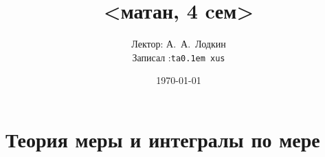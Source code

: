\documentclass[timbord,12pt]{longnotes}
\title{<матан, 4 cем>}
\date{\today}
\author{Лектор: А.~А.~Лодкин \\
Записал :\texttt{ta\lower 0.1em \hbox{x}us}}
\begin{document}
 
\maketitle
\tableofcontents
\clearpage

\chapter{Теория меры и интегралы по мере}


%
% 
%
%

% 
% 
\end{document}
